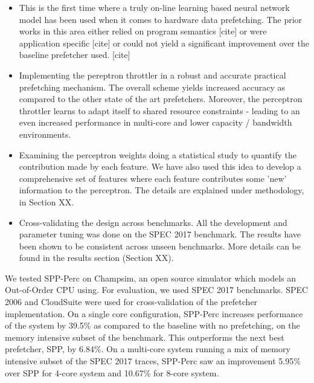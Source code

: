 \documentclass{sig-alternate}
\begin{document}
\begin{itemize}
\item This is the first time where a truly on-line learning based neural network model has been used when it comes to hardware data prefetching. 
The prior works in this area either relied on program semantics [cite] or were application specific [cite] or could not yield a significant improvement over the baseline prefetcher used. [cite]

\item Implementing the pereptron throttler in a robust and accurate practical prefetching mechanism. 
The overall scheme yields increased accuracy as compared to the other state of the art prefetchers.
Moreover, the perceptron throttler learns to adapt itself to shared resource constraints - leading to an even increased performance in multi-core and lower capacity / bandwidth environments. 

\item Examining the perceptron weights doing a statistical study to quantify the contribution made by each feature.
We have also used this idea to develop a comprehensive set of features where each feature contributes some 'new' information to the perceptron.
The details are explained under methodology, in Section XX.

\item Cross-validating the design across benchmarks. 
All the development and parameter tuning was done on the SPEC 2017 benchmark. 
The results have been shown to be consistent across unseen benchmarks.
More details can be found in the results section (Section XX).



\end{itemize}

We tested SPP-Perc on Champsim, an open source simulator which models an Out-of-Order CPU using. 
For evaluation, we used SPEC 2017 benchmarks. 
SPEC 2006 and CloudSuite were used for cross-validation of the prefetcher implementation.
On a single core configuration, SPP-Perc increases performance of the system by 39.5\% as compared to the baseline with no prefetching, on the memory intensive subset of the benchmark.
This outperforms the next best prefetcher, SPP,  by 6.84\%. 
On a multi-core system running a mix of memory intensive subset of the SPEC 2017 traces, SPP-Perc saw an improvement 5.95\% over SPP for 4-core system and 10.67\% for 8-core system.
\end{document}
